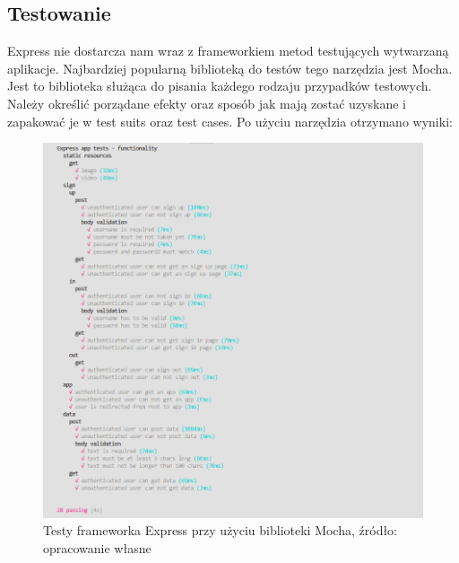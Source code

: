 \documentclass[12pt]{report}
\begin{document}
    \subsection{Testowanie}
      Express nie dostarcza nam wraz z frameworkiem metod testujących wytwarzaną aplikacje. 
      Najbardziej popularną biblioteką do testów tego narzędzia jest Mocha.
      Jest to biblioteka służąca do pisania każdego rodzaju przypadków testowych.
      Należy określić porządane efekty oraz sposób jak mają zostać uzyskane i zapakować je w test suits oraz test cases.
      Po użyciu narzędzia otrzymano wyniki:
      \begin{figure}[!hb]
        \centering
        \includegraphics[width=\textwidth,height=\textheight,keepaspectratio]{test_express.png} 
        \caption{Testy frameworka Express przy użyciu biblioteki Mocha, źródło: opracowanie własne}
      \end{figure}
\end{document}
